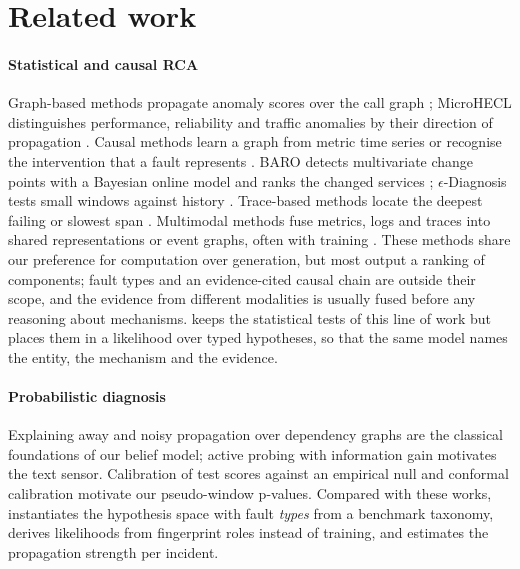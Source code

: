 \section{Related work}\label{sec:related}

\paragraph{Statistical and causal RCA}
Graph-based methods propagate anomaly scores over the call graph \citep{wu2020microrca,lin2018microscope}; MicroHECL distinguishes
performance, reliability and traffic anomalies by their direction of propagation \citep{liu2021microhecl}. Causal methods learn a
graph from metric time series or recognise the intervention that a fault represents \citep{ikram2022rcd,li2022circa,meng2020microcause}.
BARO detects multivariate change points with a Bayesian online model and ranks the changed services \citep{pham2024baro};
$\epsilon$-Diagnosis tests small windows against history \citep{shan2019epsilon}. Trace-based methods locate the deepest failing or
slowest span \citep{li2021tracerca,yu2021microrank,guo2020graphtrace}. Multimodal methods fuse metrics, logs and traces into shared
representations or event graphs, often with training \citep{zhang2023diagfusion,lee2023eadro,yu2023nezha,zheng2024mulan}. These
methods share our preference for computation over generation, but most output a ranking of components; fault types and an
evidence-cited causal chain are outside their scope, and the evidence from different modalities is usually fused before any
reasoning about mechanisms. \gama{} keeps the statistical tests of this line of work but places them in a likelihood over typed
hypotheses, so that the same model names the entity, the mechanism and the evidence.

\paragraph{Probabilistic diagnosis}
Explaining away \citep{pearl1988probabilistic} and noisy propagation over dependency graphs \citep{bahl2007sherlock} are the
classical foundations of our belief model; active probing with information gain \citep{rish2005adaptive,lindley1956information}
motivates the text sensor. Calibration of test scores against an empirical null \citep{efron2004null} and conformal calibration
\citep{vovk2005conformal} motivate our pseudo-window p-values. Compared with these works, \gama{} instantiates the hypothesis space
with fault \emph{types} from a benchmark taxonomy, derives likelihoods from fingerprint roles instead of training, and estimates the
propagation strength per incident.

